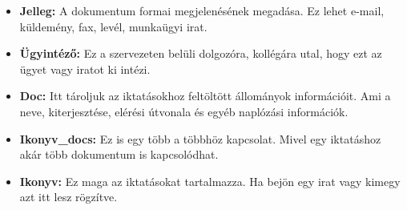 \documentclass[
]{thesis-ekf}
\theoremstyle{definition}
\theoremstyle{remark}
\begin{document}
\begin{itemize}[leftmargin=0pt]
\item[] \textbf{Jelleg: }A dokumentum formai megjelenésének megadása. Ez lehet e-mail, küldemény, fax, levél, munkaügyi irat.
\item[] \textbf{Ügyintéző: }Ez a szervezeten belüli dolgozóra, kollégára utal, hogy ezt az ügyet vagy iratot ki intézi.	
\item[] \textbf{Doc: }Itt tároljuk az iktatásokhoz feltöltött állományok információit. Ami a neve, kiterjesztése, elérési útvonala és egyéb naplózási információk.	
\item[] \textbf{Ikonyv\_docs: }	Ez is egy több a többhöz kapcsolat. Mivel egy iktatáshoz akár több dokumentum is kapcsolódhat. 
\item[] \textbf{Ikonyv: }Ez maga az iktatásokat tartalmazza. Ha bejön egy irat vagy kimegy azt itt lesz rögzítve.	
\end{itemize}
\end{document}
